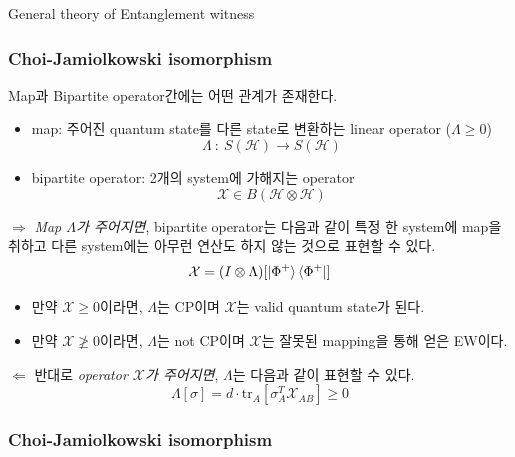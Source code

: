 \documentclass[9pt]{beamer}
\begin{document}
\begin{section}{General theory of  Entanglement witness}
        \begin{frame}
            \frametitle{Choi-Jamiolkowski isomorphism}
            Map과 Bipartite operator간에는 어떤 \alert{관계}가 존재한다.
            \begin{itemize}
                \item map: 주어진 quantum state를 다른 state로 변환하는 linear operator ($\Lambda \ge 0$)
                \begin{equation*}
                    \Lambda \ : \ S(\mathcal H) \rightarrow S(\mathcal H)
                \end{equation*}
                \item bipartite operator: 2개의 system에 가해지는 operator
                \begin{equation*}
                    \mathcal X \in B(\mathcal H \otimes \mathcal H)
                \end{equation*}
            \end{itemize}
            
            $\Rightarrow$ \textit{Map $\Lambda$가 주어지면}, bipartite operator는 다음과 같이 특정 한 system에 map을 취하고 다른 system에는 아무런 연산도 하지 않는 것으로 표현할 수 있다.
            \begin{equation*}
                \mathcal X = (I \otimes \Lambda) [\ket{\Phi^+}\bra{\Phi^+}]
            \end{equation*}
            \begin{itemize}
                \item 만약 $\mathcal X \ge 0$이라면, $\Lambda$는 CP이며 $\mathcal X$는 valid quantum state가 된다.
                \item 만약 $\mathcal X \not \ge 0$이라면, $\Lambda$는 not CP이며 $\mathcal X$는 잘못된 mapping을 통해 얻은 EW이다.
            \end{itemize}
            \vspace{0.2cm}
            $\Leftarrow$ 반대로 \textit{operator $\mathcal X$가 주어지면}, $\Lambda$는 다음과 같이 표현할 수 있다.
            \begin{equation*}
                \Lambda [\sigma] = d \cdot \text{tr}_A [\sigma_A^T \mathcal{X}_{AB}] \ge 0
            \end{equation*} 
            \vspace{-0.6cm}
        \end{frame}

        \begin{frame}
            \frametitle{Choi-Jamiolkowski isomorphism}


\end{frame}
\end{section}
\end{document}
